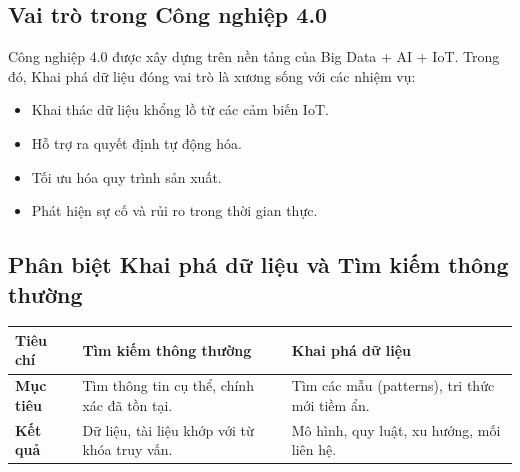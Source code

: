 \subsection{Vai trò trong Công nghiệp 4.0}
Công nghiệp 4.0 được xây dựng trên nền tảng của Big Data + AI + IoT. Trong đó, Khai phá dữ liệu đóng vai trò là xương sống với các nhiệm vụ:
\begin{itemize}
    \item Khai thác dữ liệu khổng lồ từ các cảm biến IoT.
    \item Hỗ trợ ra quyết định tự động hóa.
    \item Tối ưu hóa quy trình sản xuất.
    \item Phát hiện sự cố và rủi ro trong thời gian thực.
\end{itemize}

\subsection{Phân biệt Khai phá dữ liệu và Tìm kiếm thông thường}
\begin{table}[H]
    \centering
    \renewcommand{\arraystretch}{1.3}
    \begin{tabularx}{\textwidth}{|p{3cm}|X|X|}
        \hline
        \textbf{Tiêu chí} & \textbf{Tìm kiếm thông thường} & \textbf{Khai phá dữ liệu} \\
        \hline
        \textbf{Mục tiêu} & Tìm thông tin cụ thể, chính xác đã tồn tại. & Tìm các mẫu (patterns), tri thức mới tiềm ẩn. \\
        \hline
        \textbf{Kết quả} & Dữ liệu, tài liệu khớp với từ khóa truy vấn. & Mô hình, quy luật, xu hướng, mối liên hệ. \\
        \hline
    \end{tabularx}
\end{table}